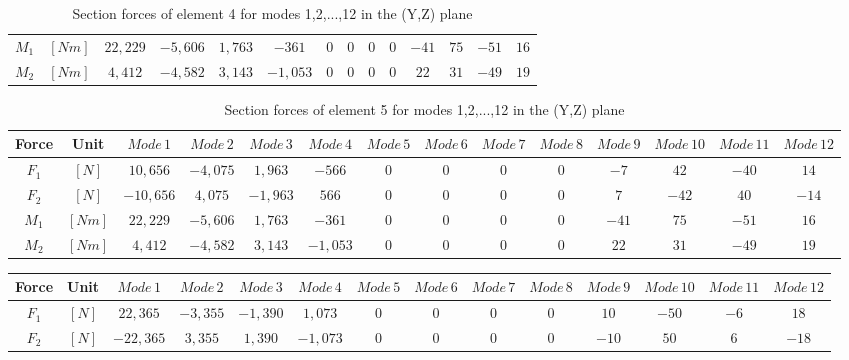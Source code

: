 \documentclass[11pt,a4paper,titlepage]{report}
\begin{document}
\begin{appendix}
\begin{landscape}
\begin{table}[]
\begin{tiny}
\begin{tabular}{c|c|c|c|c|c|c|c|c|c|c|c|c|c}
    $M_1$ & $[Nm]$ & $22,229$ &  $-5,606$  &  $1,763$ &  $-361$ &  $0$ & $0$ & $0$ & $0$&  $-41$  &  $75$ &  $-51$  &  $16$\\
    $M_2$ & $[Nm]$ & $4,412$ &  $-4,582$ & $3,143$ &  $-1,053$ & $0$ & $0$ & $0$ & $0$ & $22$ &   $31$ &  $-49$ &  $19$\\
        \end{tabular}
        \end{tiny}
    \caption{Section forces of element 4 for modes 1,2,...,12 in the (Y,Z) plane}
    \label{tab:my_label}
\end{table}
\begin{table}[]
    \centering
    \begin{tiny}
    \begin{tabular}{c|c|c|c|c|c|c|c|c|c|c|c|c|c}
   Force & Unit & $Mode\,1$ & $Mode\,2$ & $Mode\,3$ & $Mode\,4$ & $Mode\,5$ & $Mode\,6$ & $Mode\,7$ & $Mode\,8$ & $Mode\,9$ & $Mode\,10$ & $Mode\,11$ & $Mode\,12$\\
    \hline
    $F_1$ & $[N]$ & $10,656$  & $-4,075$ & $1,963$ &  $-566$ & $0$ & $0$ & $0$ & $0$ &  $-7$ &   $42$ &  $-40$ & $14$\\
    $F_2$ & $[N]$ & $-10,656$ &  $4,075$ &  $-1,963$ & $566$ & $0$ & $0$ & $0$ & $0$ & $7$ &  $-42$ & $40$ &  $-14$\\
    $M_1$ & $[Nm]$ & $22,229$ &  $-5,606$ &  $1,763$ &  $-361$  & $0$ & $0$ & $0$ & $0$ &  $-41$ & $75$ &  $-51$  & $16$\\
    $M_2$ & $[Nm]$ & $4,412$ & $-4,582$ & $3,143$ & $-1,053$ & $0$ & $0$ & $0$ & $0$ & $22$ &   $31$  & $-49$ & $19$\\
        \end{tabular}
        \end{tiny}
    \caption{Section forces of element 5 for modes 1,2,...,12 in the (Y,Z) plane}
    \label{tab:my_label}
\end{table}
\begin{table}[]
    \centering
    \begin{tiny}
    \begin{tabular}{c|c|c|c|c|c|c|c|c|c|c|c|c|c}
     Force & Unit & $Mode\,1$ & $Mode\,2$ & $Mode\,3$ & $Mode\,4$ & $Mode\,5$ & $Mode\,6$ & $Mode\,7$ & $Mode\,8$ & $Mode\,9$ & $Mode\,10$ & $Mode\,11$ & $Mode\,12$\\
    \hline
    $F_1$ & $[N]$ & $22,365$  & $-3,355$ & $-1,390$ & $1,073$ & $0$ & $0$ & $0$ & $0$ & $10$ &  $-50$ &  $-6$  &  $18$\\
    $F_2$ & $[N]$ & $-22,365$ &  $3,355$ & $1,390$ & $-1,073$ &  $0$ & $0$ & $0$ & $0$ &  $-10$ &  $50$ & $6$ &  $-18$\\

\end{tabular}
\end{tiny}
\end{table}
\end{landscape}
\end{appendix}
\end{document}
